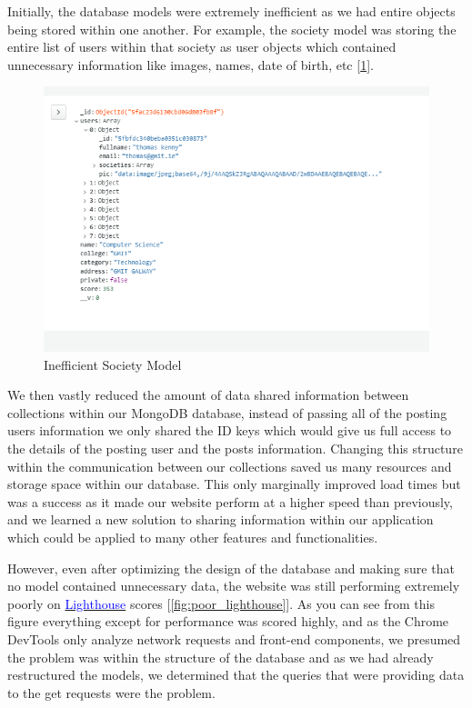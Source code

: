 Initially, the database models were extremely inefficient as we had entire objects being stored within one another. For example, the society model was storing the entire list of users within that society as user objects which contained unnecessary information like images, names, date of birth, etc [\ref{fig:inefficient_society_model}].

\begin{figure}[H]
    \centering
    \includegraphics[scale=0.8]{img/bad_society_model_1.jpg}
    \caption{Inefficient Society Model}
    \label{fig:inefficient_society_model}
\end{figure}

We then vastly reduced the amount of data shared information between collections within our MongoDB database, instead of passing all of the posting users information we only shared the ID keys which would give us full access to the details of the posting user and the posts information.
Changing this structure within the communication between our collections saved us many resources and storage space within our database. This only marginally improved load times but was a success as it made our website perform at a higher speed than previously, and we learned a new solution to sharing information within our application which could be applied to many other features and functionalities.
\newline

However, even after optimizing the design of the database and making sure that no model contained unnecessary data, the website was still performing extremely poorly on \href{https://developers.google.com/web/tools/lighthouse/}{\textcolor{blue}{Lighthouse}} scores [\ref{fig:poor_lighthouse}]. As you can see from this figure everything except for performance was scored highly, and as the Chrome DevTools only analyze network requests and front-end components, we presumed the problem was within the structure of the database and as we had already restructured the models, we determined that the queries that were providing data to the get requests were the problem.

